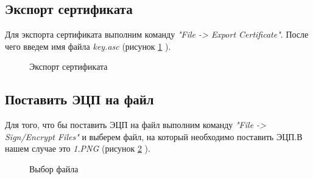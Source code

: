 \documentclass[10pt,a4paper]{report}
\begin{document}
\subsection{Экспорт сертификата}
Для экспорта сертификата выполним команду \textit{"File ->  Export Certificate"}. После чего введем имя файла \textit{key.asc} (рисунок \ref{ris:image5} ).
\begin{figure}[h]
\caption{Экспорт сертификата}
\label{ris:image5}
\end{figure}

\subsection{Поставить ЭЦП на файл}
Для того, что бы поставить ЭЦП на файл выполним команду \textit{"File -> Sign/Encrypt Files"} и выберем файл, на который необходимо поставить ЭЦП.В нашем случае это \textit{1.PNG} (рисунок \ref{ris:image6} ).
\begin{figure}[h]
\caption {Выбор файла}
\label{ris:image6}
\end{figure}
\end{document}
